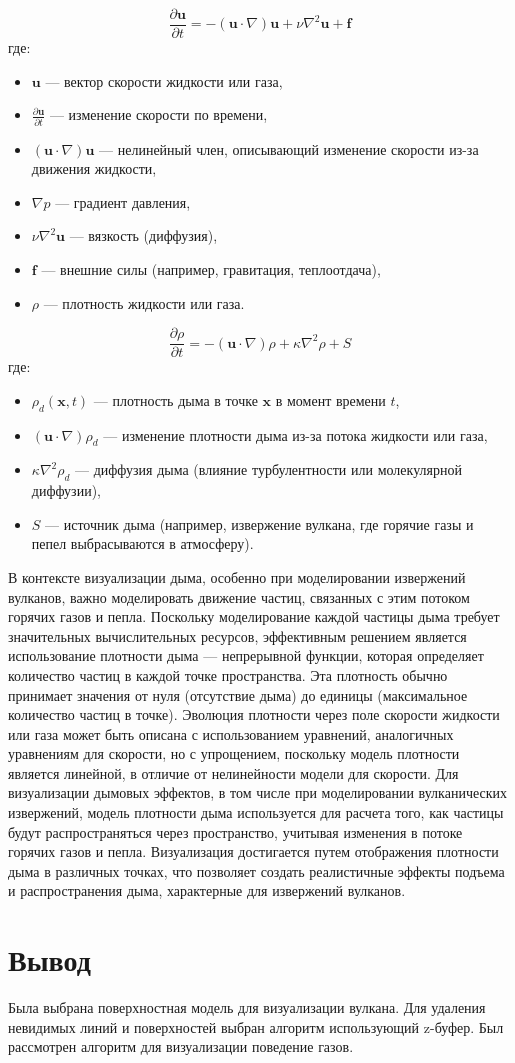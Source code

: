 \[
\frac{\partial \bm{u}}{\partial t} = -(\bm{u} \cdot \nabla) \bm{u} + \nu \nabla^2 \bm{u} + \bm{f}
\]
где:
\begin{itemize}
	\item \(\bm{u}\) — вектор скорости жидкости или газа,
	\item \(\frac{\partial \bm{u}}{\partial t}\) — изменение скорости по времени,
	\item \((\bm{u} \cdot \nabla) \bm{u}\) — нелинейный член, описывающий изменение скорости из-за движения жидкости,
	\item \(\nabla p\) — градиент давления,
	\item \(\nu \nabla^2 \bm{u}\) — вязкость (диффузия),
	\item \(\bm{f}\) — внешние силы (например, гравитация, теплоотдача),
	\item \(\rho\) — плотность жидкости или газа.
\end{itemize}
\[
\frac{\partial \rho}{\partial t} = -(\bm{u} \cdot \nabla) \rho + \kappa \nabla^2 \rho + S
\]
где:
\begin{itemize}
	\item \(\rho_d(\bm{x}, t)\) — плотность дыма в точке \(\bm{x}\) в момент времени \(t\),
	\item \((\bm{u} \cdot \nabla) \rho_d\) — изменение плотности дыма из-за потока жидкости или газа,
	\item \(\kappa \nabla^2 \rho_d\) — диффузия дыма (влияние турбулентности или молекулярной диффузии),
	\item \(S\) — источник дыма (например, извержение вулкана, где горячие газы и пепел выбрасываются в атмосферу).
\end{itemize}
	
В контексте визуализации дыма, особенно при моделировании извержений вулканов, важно моделировать движение частиц, связанных с этим потоком горячих газов и пепла. Поскольку моделирование каждой частицы дыма требует значительных вычислительных ресурсов, эффективным решением является использование плотности дыма — непрерывной функции, которая определяет количество частиц в каждой точке пространства. Эта плотность обычно принимает значения от нуля (отсутствие дыма) до единицы (максимальное количество частиц в точке). Эволюция плотности через поле скорости жидкости или газа может быть описана с использованием уравнений, аналогичных уравнениям для скорости, но с упрощением, поскольку модель плотности является линейной, в отличие от нелинейности модели для скорости. Для визуализации дымовых эффектов, в том числе при моделировании вулканических извержений, модель плотности дыма используется для расчета того, как частицы будут распространяться через пространство, учитывая изменения в потоке горячих газов и пепла. Визуализация достигается путем отображения плотности дыма в различных точках, что позволяет создать реалистичные эффекты подъема и распространения дыма, характерные для извержений вулканов. 
\section*{Вывод}
Была выбрана поверхностная модель для визуализации вулкана.
Для удаления невидимых линий и поверхностей выбран алгоритм использующий z-буфер. Был рассмотрен алгоритм для визуализации поведение газов.
